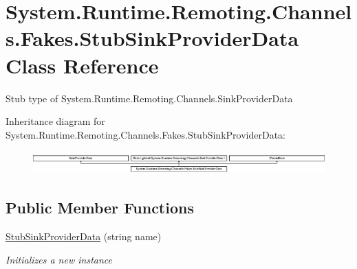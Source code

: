 \hypertarget{class_system_1_1_runtime_1_1_remoting_1_1_channels_1_1_fakes_1_1_stub_sink_provider_data}{\section{System.\-Runtime.\-Remoting.\-Channels.\-Fakes.\-Stub\-Sink\-Provider\-Data Class Reference}
\label{class_system_1_1_runtime_1_1_remoting_1_1_channels_1_1_fakes_1_1_stub_sink_provider_data}
}


Stub type of System.\-Runtime.\-Remoting.\-Channels.\-Sink\-Provider\-Data 


Inheritance diagram for System.\-Runtime.\-Remoting.\-Channels.\-Fakes.\-Stub\-Sink\-Provider\-Data\-:\begin{figure}[H]
\begin{center}
\leavevmode
\includegraphics[height=0.903955cm]{class_system_1_1_runtime_1_1_remoting_1_1_channels_1_1_fakes_1_1_stub_sink_provider_data}
\end{center}
\end{figure}
\subsection*{Public Member Functions}
\begin{DoxyCompactItemize}
\item 
\hyperlink{class_system_1_1_runtime_1_1_remoting_1_1_channels_1_1_fakes_1_1_stub_sink_provider_data_a3987b8cc213754d23f204f5959bd4796}{Stub\-Sink\-Provider\-Data} (string name)
\begin{DoxyCompactList}\small\item\em Initializes a new instance\end{DoxyCompactList}\end{DoxyCompactItemize}
